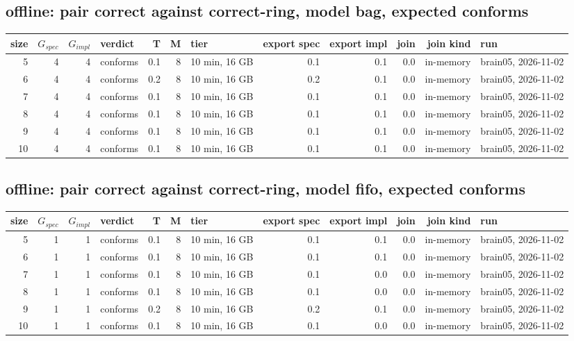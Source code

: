 \documentclass[10pt]{article}
\begin{document}
\subsection*{offline: pair \textsf{correct} against \textsf{correct-ring}, model bag, expected conforms}
\begin{longtable}{@{}rrrlrrlrrrrl@{}}
\toprule
size & $G_{\mathit{spec}}$ & $G_{\mathit{impl}}$ & verdict & T & M & tier & export spec & export impl & join & join kind & run \\
\midrule
\endhead
\color{red} 5 & 4 & 4 & conforms & 0.1 & 8 & 10 min, 16 GB & 0.1 & 0.1 & 0.0 & in-memory & brain05, 2026-11-02 \\
\color{red} 6 & 4 & 4 & conforms & 0.2 & 8 & 10 min, 16 GB & 0.2 & 0.1 & 0.0 & in-memory & brain05, 2026-11-02 \\
\color{red} 7 & 4 & 4 & conforms & 0.1 & 8 & 10 min, 16 GB & 0.1 & 0.1 & 0.0 & in-memory & brain05, 2026-11-02 \\
\color{red} 8 & 4 & 4 & conforms & 0.1 & 8 & 10 min, 16 GB & 0.1 & 0.1 & 0.0 & in-memory & brain05, 2026-11-02 \\
\color{red} 9 & 4 & 4 & conforms & 0.1 & 8 & 10 min, 16 GB & 0.1 & 0.1 & 0.0 & in-memory & brain05, 2026-11-02 \\
\color{red} 10 & 4 & 4 & conforms & 0.1 & 8 & 10 min, 16 GB & 0.1 & 0.1 & 0.0 & in-memory & brain05, 2026-11-02 \\
\bottomrule
\end{longtable}
\subsection*{offline: pair \textsf{correct} against \textsf{correct-ring}, model fifo, expected conforms}
\begin{longtable}{@{}rrrlrrlrrrrl@{}}
\toprule
size & $G_{\mathit{spec}}$ & $G_{\mathit{impl}}$ & verdict & T & M & tier & export spec & export impl & join & join kind & run \\
\midrule
\endhead
\color{red} 5 & 1 & 1 & conforms & 0.1 & 8 & 10 min, 16 GB & 0.1 & 0.1 & 0.0 & in-memory & brain05, 2026-11-02 \\
\color{red} 6 & 1 & 1 & conforms & 0.1 & 8 & 10 min, 16 GB & 0.1 & 0.1 & 0.0 & in-memory & brain05, 2026-11-02 \\
\color{red} 7 & 1 & 1 & conforms & 0.1 & 8 & 10 min, 16 GB & 0.1 & 0.0 & 0.0 & in-memory & brain05, 2026-11-02 \\
\color{red} 8 & 1 & 1 & conforms & 0.1 & 8 & 10 min, 16 GB & 0.1 & 0.0 & 0.0 & in-memory & brain05, 2026-11-02 \\
\color{red} 9 & 1 & 1 & conforms & 0.2 & 8 & 10 min, 16 GB & 0.2 & 0.1 & 0.0 & in-memory & brain05, 2026-11-02 \\
\color{red} 10 & 1 & 1 & conforms & 0.1 & 8 & 10 min, 16 GB & 0.1 & 0.0 & 0.0 & in-memory & brain05, 2026-11-02 \\
\bottomrule
\end{longtable}
\end{document}
